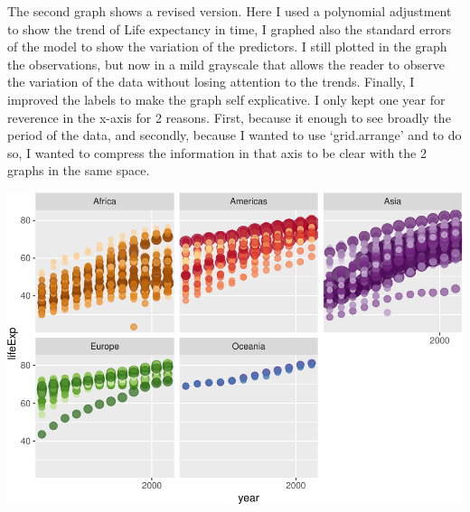 \documentclass[]{article}
\newenvironment{Shaded}{\begin{snugshade}}{\end{snugshade}}
\newcommand{\DataTypeTok}[1]{\textcolor[rgb]{0.13,0.29,0.53}{#1}}
\newcommand{\DecValTok}[1]{\textcolor[rgb]{0.00,0.00,0.81}{#1}}
\newcommand{\FloatTok}[1]{\textcolor[rgb]{0.00,0.00,0.81}{#1}}
\newcommand{\KeywordTok}[1]{\textcolor[rgb]{0.13,0.29,0.53}{\textbf{#1}}}
\newcommand{\NormalTok}[1]{#1}
\newcommand{\OperatorTok}[1]{\textcolor[rgb]{0.81,0.36,0.00}{\textbf{#1}}}
\newcommand{\StringTok}[1]{\textcolor[rgb]{0.31,0.60,0.02}{#1}}
\begin{document}
The second graph shows a revised version. Here I used a polynomial
adjustment to show the trend of Life expectancy in time, I graphed also
the standard errors of the model to show the variation of the
predictors. I still plotted in the graph the observations, but now in a
mild grayscale that allows the reader to observe the variation of the
data without losing attention to the trends. Finally, I improved the
labels to make the graph self explicative. I only kept one year for
reverence in the x-axis for 2 reasons. First, because it enough to see
broadly the period of the data, and secondly, because I wanted to use
`grid.arrange' and to do so, I wanted to compress the information in
that axis to be clear with the 2 graphs in the same space.

\begin{Shaded}
\end{Shaded}

\includegraphics{hw05_files/figure-latex/unnamed-chunk-12-1.pdf}
\end{document}
